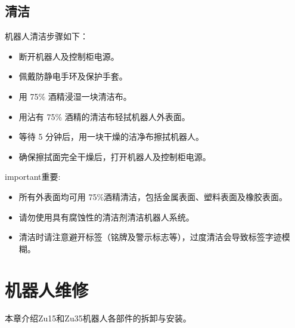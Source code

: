 \documentclass[a4paper,11pt,english,openany,oneside]{sphinxmanual}
\begin{document}
\section{清洁}
\label{\detokenize{_u5b9a_u671f_u68c0_u67e5_u4e0e_u6e05_u6d01:id5}}\label{\detokenize{_u5b9a_u671f_u68c0_u67e5_u4e0e_u6e05_u6d01:id6}}
\sphinxAtStartPar
机器人清洁步骤如下：
\begin{itemize}
\item {} 
\sphinxAtStartPar
断开机器人及控制柜电源。

\item {} 
\sphinxAtStartPar
佩戴防静电手环及保护手套。

\item {} 
\sphinxAtStartPar
用 75\% 酒精浸湿一块清洁布。

\item {} 
\sphinxAtStartPar
用沾有 75\% 酒精的清洁布轻拭机器人外表面。

\item {} 
\sphinxAtStartPar
等待 5 分钟后，用一块干燥的洁净布擦拭机器人。

\item {} 
\sphinxAtStartPar
确保擦拭面完全干燥后，打开机器人及控制柜电源。

\end{itemize}

\begin{sphinxadmonition}{important}{重要:}\begin{itemize}
\item {} 
\sphinxAtStartPar
所有外表面均可用 75\%酒精清洁，包括金属表面、塑料表面及橡胶表面。

\item {} 
\sphinxAtStartPar
请勿使用具有腐蚀性的清洁剂清洁机器人系统。

\item {} 
\sphinxAtStartPar
清洁时请注意避开标签（铭牌及警示标志等），过度清洁会导致标签字迹模糊。

\end{itemize}
\end{sphinxadmonition}

\sphinxstepscope


\chapter{机器人维修}
\label{\detokenize{_u673a_u5668_u4eba_u7ef4_u4fee:id1}}\label{\detokenize{_u673a_u5668_u4eba_u7ef4_u4fee:id2}}\label{\detokenize{_u673a_u5668_u4eba_u7ef4_u4fee::doc}}
\sphinxAtStartPar
本章介绍Zu15和Zu35机器人各部件的拆卸与安装。
\end{document}
